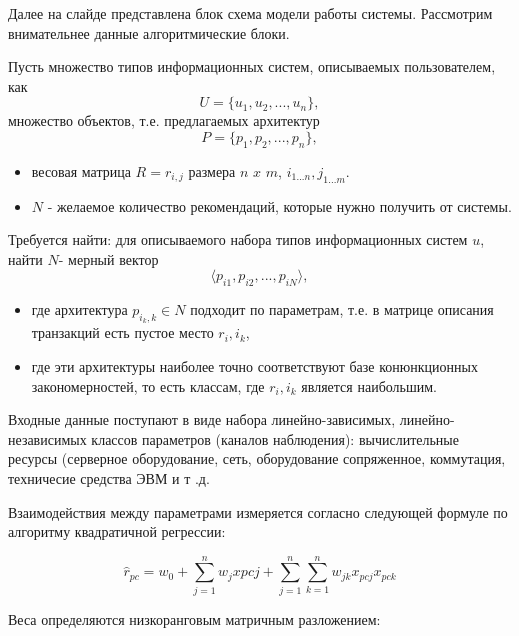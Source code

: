 \documentclass[review]{elsarticle}
\begin{document}
Далее на слайде представлена блок схема модели работы системы. Рассмотрим внимательнее данные алгоритмические блоки.

Пусть множество типов информационных систем, описываемых пользователем, как 
\begin{equation}
     U=\{u_1,u_2,...,u_n\},
\end{equation}
   множество объектов, т.е. предлагаемых архитектур 
    \begin{equation}
    P=\{p_1,p_2,...,p_n\},
    \end{equation}
    \begin{itemize}
\item     весовая матрица  $R=r_{i,j}$ размера $n$ $x$ $m$,  $i_{1...n},j_{1...m}$. 
 \item    $N$ - желаемое количество рекомендаций, которые нужно получить от системы. 
 \end{itemize}



    Требуется найти: для описываемого набора типов информационных систем $u$, найти $N $- мерный вектор 
    \begin{equation}
    \langle p_{i1},p_{i2},...,p_{iN} \rangle, 
    \end{equation}
        \begin{itemize}
        \item где архитектура $p_{i_k,k}\in N$  подходит по параметрам, т.е. в матрице описания транзакций есть пустое место $r_i,i_k$,
        \item где эти архитектуры наиболее точно соответствуют базе конюнкционных закономерностей, то есть классам, где $r_i,i_k$ является наибольшим. 
    \end{itemize}
     



Входные данные поступают в виде набора линейно-зависимых, линейно-независимых классов параметров (каналов наблюдения): вычислительные ресурсы (серверное оборудование, сеть, оборудование сопряженное, коммутация, техничесие средства ЭВМ и т .д. 

Взаимодействия между параметрами измеряется согласно следующей формуле по алгоритму квадратичной регрессии:

\begin{equation}
    \label{eq:equation_FM}
    \hat{r}_{pc} = w_{0} + \sum_{j=1}^{n} w_{j}x{pcj} + \sum_{j=1}^{n}\sum_{k=1}^{n} w_{jk}x_{pcj}x_{pck}
\end{equation}

Веса определяются низкоранговым матричным разложением:
\end{document}
